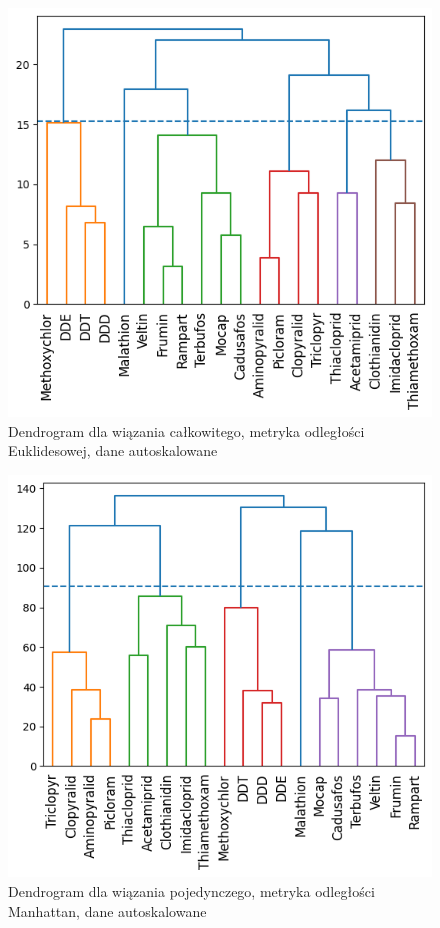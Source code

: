 \documentclass[12pt, a4paper]{article}
\begin{document}
    \begin{figure}[H]
        \centering
        \includegraphics{wc_Euk.png}
        \caption{Dendrogram dla wiązania całkowitego, metryka odległości Euklidesowej, dane autoskalowane}
    \end{figure}

    \begin{figure}[H]
        \centering
        \includegraphics{wp_Manh.png}
        \caption{Dendrogram dla wiązania pojedynczego, metryka odległości Manhattan, dane autoskalowane}
    \end{figure}
\end{document}
